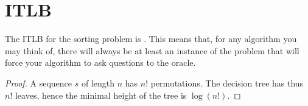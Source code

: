 \section{ITLB}
\label{tree:sorting:ITLB}

\begin{theorem}
The ITLB for the sorting problem is . This means that, for any algorithm you may think of, there will always be at least an instance of the problem that will force your algorithm to ask  questions to the oracle.
\end{theorem}

\begin{proof}
A sequence $s$ of length $n$ has $n!$ permutations. The decision tree has thus $n!$ leaves, hence the minimal height of the tree is $\log(n!)$.
\end{proof}

